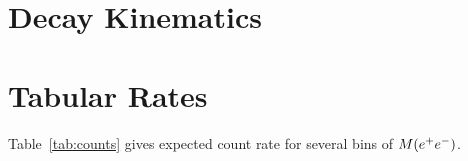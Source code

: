 \section{Decay Kinematics}\label{sec:app.kinematics}



\section{Tabular Rates}\label{sec:app.rates}
Table~\ref{tab:counts} gives expected count rate for several bins of $M(e^+e^-)$.

